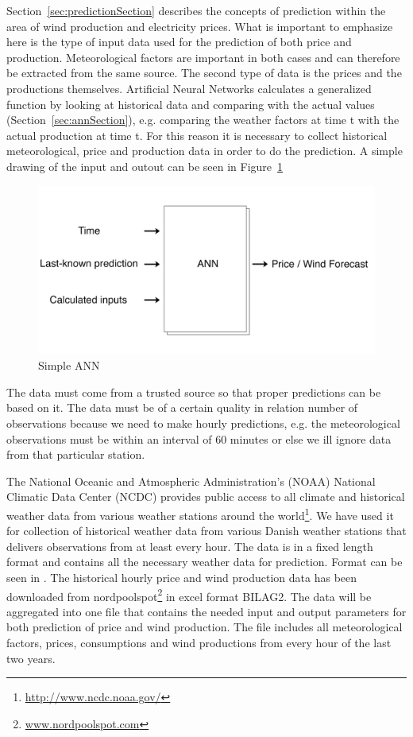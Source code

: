 Section~\ref{sec:predictionSection} describes the concepts of prediction within the area of wind production and electricity prices. What is important to emphasize here is the type of input data used for the prediction of both price and production. Meteorological factors are important in both cases and can therefore be extracted from the same source. The second type of data is the prices and the productions themselves. Artificial Neural Networks calculates a generalized function by looking at historical data and comparing with the actual values (Section~\ref{sec:annSection}), e.g. comparing the weather factors at time t with the actual production at time t. For this reason it is necessary to collect historical meteorological, price and production data in order to do the prediction. A simple drawing of the input and outout can be seen in Figure~\ref{fig:verySimpleANN}

\begin{figure}[H]
\centering
\includegraphics[width=0.85\linewidth,natwidth=898,natheight=587]{billeder/simpleANN.png}
\caption{Simple ANN}
\label{fig:verySimpleANN}
\end{figure}

The data must come from a trusted source so that proper predictions can be based on it. The data must be of a certain quality in relation number of observations because we need to make hourly predictions, e.g. the meteorological observations must be within an interval of 60 minutes or else we ill ignore data from that particular station.

The National Oceanic and Atmospheric Administration's (NOAA) National Climatic Data Center (NCDC) provides public access to all climate and historical weather data from various weather stations around the world\footnote{\url{http://www.ncdc.noaa.gov/}}. We have used it for collection of historical weather data from various Danish weather stations that delivers observations from at least every hour. The data is in a fixed length format and contains all the necessary weather data for prediction. Format can be seen in . 
The historical hourly price and wind production data has been downloaded from nordpoolspot\footnote{\url{www.nordpoolspot.com}} in excel format BILAG2.
The data will be aggregated into one file that contains the needed input and output parameters for both prediction of price and wind production. The file includes all meteorological factors, prices, consumptions and wind productions from every hour of the last two years. 

